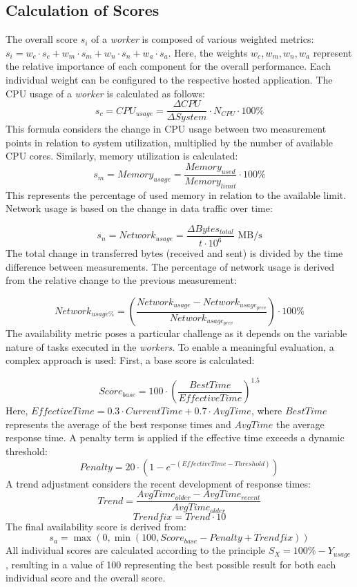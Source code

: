 \documentclass[twocolumn]{webofc}
\begin{document}
\newpage
\subsection{Calculation of Scores}

The overall score \( s_i \) of a \textit{worker} is composed of various weighted metrics: $s_i = w_c \cdot s_c + w_m \cdot s_m + w_n \cdot s_n + w_a \cdot s_a$. Here, the weights \( w_c, w_m, w_n, w_a \) represent the relative importance of each component for the overall performance. Each individual weight can be configured to the respective hosted application. The CPU usage of a \textit{worker} is calculated as follows:
$$s_c = CPU_{usage} = \frac{\Delta CPU}{\Delta System} \cdot N_{CPU} \cdot 100\%$$
This formula considers the change in CPU usage between two measurement points in relation to system utilization, multiplied by the number of available CPU cores. Similarly, memory utilization is calculated:
$$s_m =Memory_{usage} = \frac{Memory_{used}}{Memory_{limit}} \cdot 100\%$$
This represents the percentage of used memory in relation to the available limit. Network usage is based on the change in data traffic over time:

$$s_n = Network_{usage} = \frac{\Delta Bytes_{total}}{t \cdot 10^6} \text{ MB/s}$$
The total change in transferred bytes (received and sent) is divided by the time difference between measurements. The percentage of network usage is derived from the relative change to the previous measurement:

$$Network_{usage\%} = \left(\frac{Network_{usage} - Network_{usage_{prev}}}{Network_{usage_{prev}}}\right) \cdot 100\%$$
The availability metric poses a particular challenge as it depends on the variable nature of tasks executed in the \textit{workers}. To enable a meaningful evaluation, a complex approach is used: First, a base score is calculated:

$$Score_{base} = 100 \cdot \left(\frac{BestTime}{EffectiveTime}\right)^{1.5}$$
Here, \( EffectiveTime = 0.3 \cdot CurrentTime + 0.7 \cdot AvgTime \), where \( BestTime \) represents the average of the best response times and \( AvgTime \) the average response time. A penalty term is applied if the effective time exceeds a dynamic threshold:
$$Penalty = 20 \cdot (1 - e^{-(EffectiveTime - Threshold)})$$ A trend adjustment considers the recent development of response times:
$$Trend = \frac{AvgTime_{older} - AvgTime_{recent}}{AvgTime_{older}}$$
$$Trendfix = Trend \cdot 10$$
The final availability score is derived from:
$$s_a = \max(0, \min(100, Score_{base} - Penalty + Trendfix))$$
All individual scores are calculated according to the principle \( S_X = 100\% - Y_{usage} \), resulting in a value of 100 representing the best possible result for both each individual score and the overall score.
\end{document}

